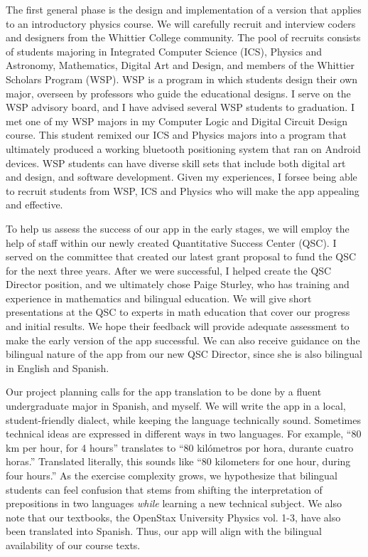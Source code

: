 \documentclass[11pt]{amsart}
\begin{document}
The first general phase is the design and implementation of a version that applies to an introductory physics course.  We will carefully recruit and interview coders and designers from the Whittier College community.  The pool of recruits consists of students majoring in Integrated Computer Science (ICS), Physics and Astronomy, Mathematics, Digital Art and Design, and members of the Whittier Scholars Program (WSP).  WSP is a program in which students design their own major, overseen by professors who guide the educational designs.  I serve on the WSP advisory board, and I have advised several WSP students to graduation.  I met one of my WSP majors in my Computer Logic and Digital Circuit Design course.  This student remixed our ICS and Physics majors into a program that ultimately produced a working bluetooth positioning system that ran on Android devices.  WSP students can have diverse skill sets that include both digital art and design, and software development.  Given my experiences, I forsee being able to recruit students from WSP, ICS and Physics who will make the app appealing and effective.

To help us assess the success of our app in the early stages, we will employ the help of staff within our newly created Quantitative Success Center (QSC).  I served on the committee that created our latest grant proposal to fund the QSC for the next three years.  After we were successful, I helped create the QSC Director position, and we ultimately chose Paige Sturley, who has training and experience in mathematics and bilingual education.  We will give short presentations at the QSC to experts in math education that cover our progress and initial results.  We hope their feedback will provide adequate assessment to make the early version of the app successful.  We can also receive guidance on the bilingual nature of the app from our new QSC Director, since she is also bilingual in English and Spanish.

Our project planning calls for the app translation to be done by a fluent undergraduate major in Spanish, and myself.  We will write the app in a local, student-friendly dialect, while keeping the language technically sound.  Sometimes technical ideas are expressed in different ways in two languages.  For example, ``80 km per hour, for 4 hours'' translates to ``80 kil\'{o}metros por hora, durante cuatro horas.''  Translated literally, this sounds like ``80 kilometers for one hour, during four hours.''  As the exercise complexity grows, we hypothesize that bilingual students can feel confusion that stems from shifting the interpretation of prepositions in two languages \textit{while} learning a new technical subject.  We also note that our textbooks, the OpenStax University Physics vol. 1-3, have also been translated into Spanish.  Thus, our app will align with the bilingual availability of our course texts.
\end{document}
